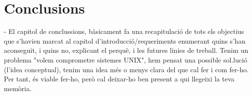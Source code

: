 \chapter{Conclusions}
        - El capitol de conclussions, bàsicament fa una
        recapitulació de tots els objectius que s'havien
        marcat al capitol d'introducció/requeriments
        enumerant quins s'han aconseguit, i quins no,
        explicant el perquè, i les futures linies de treball.
Tenim un
        problema "volem comprometre sistemes UNIX", hem
        pensat una possible sol.lució (l'idea conceptual),
        tenim una idea més o menys clara del que cal fer i
        com fer-ho. Per tant, és viable fer-ho, però cal
        deixar-ho ben present a qui llegeixi la teva memòria.
